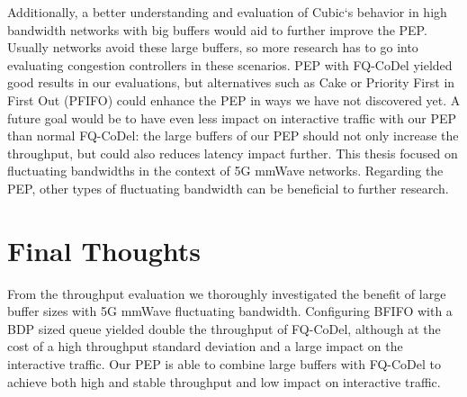 \documentclass[a4paper,english, 12pt]{report}
\begin{document}
Additionally, a better understanding and evaluation of Cubic`s behavior in high bandwidth networks with big buffers would aid to further improve the PEP. Usually networks avoid these large buffers, so more research has to go into evaluating congestion controllers in these scenarios. PEP with FQ-CoDel yielded good results in our evaluations, but alternatives such as Cake or Priority First in First Out (PFIFO) could enhance the PEP in ways we have not discovered yet. A future goal would be to have even less impact on interactive traffic with our PEP than normal FQ-CoDel: the large buffers of our PEP should not only increase the throughput, but could also reduces latency impact further. This thesis focused on fluctuating bandwidths in the context of 5G mmWave networks. Regarding the PEP, other types of fluctuating bandwidth can be beneficial to further research.\\

\section{Final Thoughts}
From the throughput evaluation we thoroughly investigated the benefit of large buffer sizes with 5G mmWave fluctuating bandwidth. Configuring BFIFO with a BDP sized queue yielded double the throughput of FQ-CoDel, although at the cost of a high throughput standard deviation and a large impact on the interactive traffic. Our PEP is able to combine large buffers with FQ-CoDel to achieve both high and stable throughput and low impact on interactive traffic.\\

{}

\end{document}
